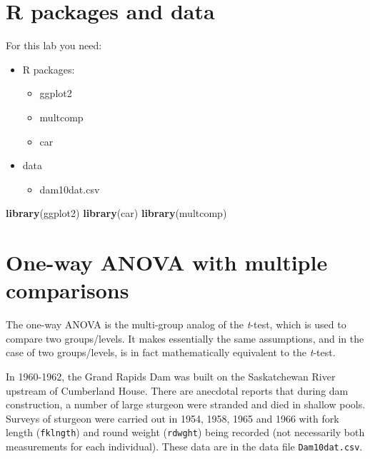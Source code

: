\documentclass[
  12pt,
]{book}
\newenvironment{Shaded}{\begin{snugshade}}{\end{snugshade}}
\newcommand{\KeywordTok}[1]{\textcolor[rgb]{0.13,0.29,0.53}{\textbf{#1}}}
\newcommand{\NormalTok}[1]{#1}
\providecommand{\tightlist}{%
  \setlength{\itemsep}{0pt}\setlength{\parskip}{0pt}}
\begin{document}
\hypertarget{set-ano}{%
\section{R packages and data}\label{set-ano}}

For this lab you need:

\begin{itemize}
\tightlist
\item
  R packages:

  \begin{itemize}
  \tightlist
  \item
    ggplot2
  \item
    multcomp
  \item
    car
  \end{itemize}
\item
  data

  \begin{itemize}
  \tightlist
  \item
    dam10dat.csv
  \end{itemize}
\end{itemize}

\begin{Shaded}
\begin{Highlighting}[]
\KeywordTok{library}\NormalTok{(ggplot2)}
\KeywordTok{library}\NormalTok{(car)}
\KeywordTok{library}\NormalTok{(multcomp)}
\end{Highlighting}
\end{Shaded}

\hypertarget{one-way-anova-with-multiple-comparisons}{%
\section{One-way ANOVA with multiple comparisons}\label{one-way-anova-with-multiple-comparisons}}

The one-way ANOVA is the multi-group analog of the \emph{t}-test, which is used to compare two groups/levels. It makes essentially the same assumptions, and in the case of two groups/levels, is in fact mathematically equivalent to the \emph{t}-test.

In 1960-1962, the Grand Rapids Dam was built on the Saskatchewan River upstream of Cumberland House. There are anecdotal reports that during dam construction, a number of large sturgeon were stranded and died in shallow pools. Surveys of sturgeon were carried out in 1954, 1958, 1965 and 1966 with fork length (\texttt{fklngth}) and round weight (\texttt{rdwght}) being recorded (not necessarily both measurements for each individual). These data are in the data file \texttt{Dam10dat.csv}.
\end{document}
